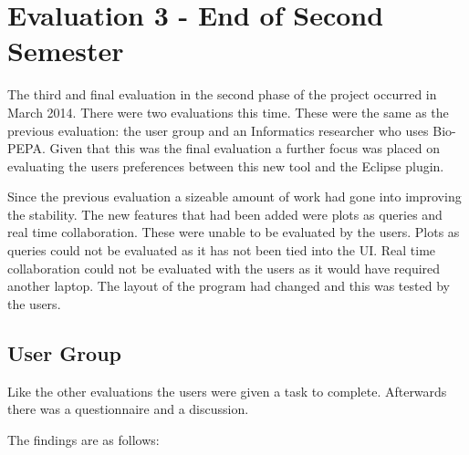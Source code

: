 \section{Evaluation 3 - End of Second Semester}

The third and final evaluation in the second phase of the project occurred in March 2014.  There were two evaluations this time.  These were the same as the previous evaluation: the user group and an Informatics researcher who uses Bio-PEPA.  Given that this was the final evaluation a further focus was placed on evaluating the users preferences between this new tool and the Eclipse plugin.

Since the previous evaluation a sizeable amount of work had gone into improving the stability.  The new features that had been added were plots as queries and real time collaboration.  These were unable to be evaluated by the users. Plots as queries could not be evaluated as it has not been tied into the \ac{UI}.  Real time collaboration could not be evaluated with the users as it would have required another laptop.  The layout of the program had changed and this was tested by the users.

\subsection{User Group}

Like the other evaluations the users were given a task to complete.  Afterwards there was a questionnaire and a discussion.

The findings are as follows:

